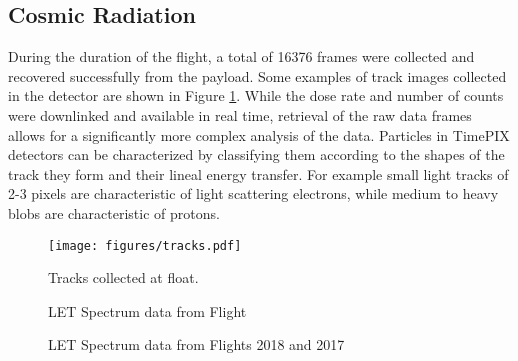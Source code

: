 \subsection{Cosmic Radiation}
\label{sec:Cosmic-Radiation-Results}

During the duration of the flight, a total of 16376 frames were collected and recovered successfully from the payload. Some examples of track images collected in the detector are shown in Figure \ref{tracks}. While the dose rate and number of counts were downlinked and available in real time, retrieval of the raw data frames allows for a significantly more complex analysis of the data. Particles in TimePIX detectors can be characterized by classifying them according to the shapes of the track they form and their lineal energy transfer. For example small light tracks of 2-3 pixels are characteristic of light scattering electrons, while medium to heavy blobs are characteristic of protons.

\begin{figure}[H]
	\begin{center}
	\texttt{[image: figures/tracks.pdf]}
	\caption{Tracks collected at float.}
	\label{tracks}
	\end{center}
\end{figure}

\begin{figure}[H]
\hfill
{}
\hfill
{}
\hfill
\caption{LET Spectrum data from Flight}
\end{figure}

\begin{figure}[H]
\hfill
{}
\hfill
{}
\hfill
\caption{LET Spectrum data from Flights 2018 and 2017}
\end{figure}

